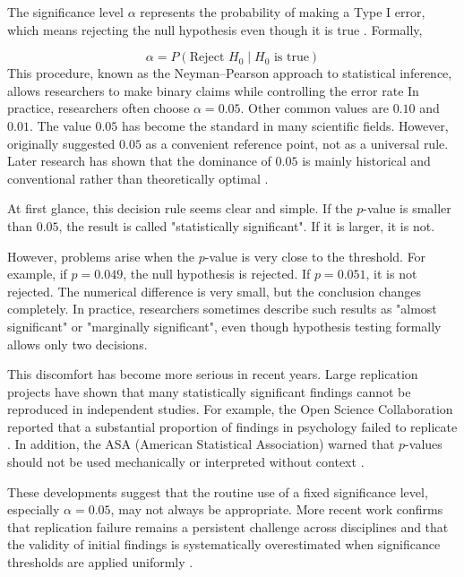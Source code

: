 The significance level $\alpha$ represents the probability of making a Type I error, which means rejecting the null hypothesis even though it is true \cite{NeymanPearson1933}. Formally,

\begin{equation}
	\alpha = P(\text{Reject } H_0 \mid H_0 \text{ is true})
\end{equation}
This procedure, known as the Neyman–Pearson approach to statistical inference, allows researchers to make binary claims while controlling the error rate\cite{Lakens2021}
In practice, researchers often choose $\alpha = 0.05$. Other common values are $0.10$ and $0.01$. The value $0.05$ has become the standard in many scientific fields. However, \cite{Fisher1925} originally suggested $0.05$ as a convenient reference point, not as a universal rule. Later research has shown that the dominance of $0.05$ is mainly historical and conventional rather than theoretically optimal \cite{CowlesDavis1982}.

At first glance, this decision rule seems clear and simple. If the $p$-value is smaller than $0.05$, the result is called "statistically significant". If it is larger, it is not.

However, problems arise when the $p$-value is very close to the threshold. For example, if $p = 0.049$, the null hypothesis is rejected. If $p = 0.051$, it is not rejected. The numerical difference is very small, but the conclusion changes completely. In practice, researchers sometimes describe such results as "almost significant" or "marginally significant", even though hypothesis testing formally allows only two decisions\cite{Pritschet2016}.

This discomfort has become more serious in recent years. Large replication projects have shown that many statistically significant findings cannot be reproduced in independent studies. For example, the Open Science Collaboration \cite{OpenScience2015} reported that a substantial proportion of findings in psychology failed to replicate . In addition, the ASA (American Statistical Association) warned that $p$-values should not be used mechanically or interpreted without context \cite{WassersteinLazar2016}.

These developments suggest that the routine use of a fixed significance level, especially $\alpha = 0.05$, may not always be appropriate.  More recent work confirms that replication failure remains a persistent challenge across disciplines  and that the validity of initial findings is systematically overestimated when significance thresholds are applied uniformly \cite{Nosek22}.

